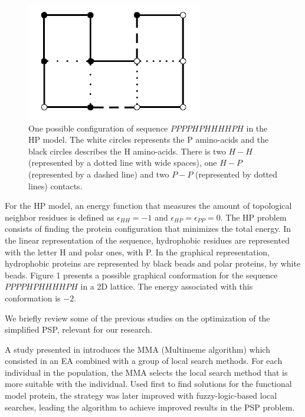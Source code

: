 \documentclass[conference]{IEEEtran}
\begin{document}
\begin{figure}[htb!] \label{fig:PROTEXAM}
	\centering
	\includegraphics[scale=0.7]{figures/proteinExample.png}
	\caption{One possible configuration of  sequence $PPPPHPHHHHPH$ in the HP model. The white circles represents the P amino-acids and the black circles describes the H amino-acids. There is two $H-H$ (represented by a dotted line with wide spaces), one $H-P$ (represented by a dashed line) and  two $P-P$  (represented by dotted lines) contacts.}
\end{figure}




For the HP model, an energy function that  measures the amount of topological  neighbor residues is defined  as  $\epsilon_{HH}=-1$ and $\epsilon_{HP}=\epsilon_{PP}=0$. The HP problem consists of finding the protein configuration that minimizes the total energy. In the linear representation of the sequence, hydrophobic residues are represented with the letter H and polar ones, with P. In the graphical representation, hydrophobic proteins are represented  by black beads and polar proteins, by white beads.  Figure 1 presents a possible graphical conformation  for  the sequence  $PPPPHPHHHHPH$ in a 2D lattice. The energy associated with this conformation is $-2$. 


We briefly review some of the previous studies on the optimization of the simplified PSP, relevant for our research.


%


A study presented in \cite{krasnogor2002multimeme} introduces the MMA (Multimeme algorithm) which consisted in an EA combined with a
group of local search methods. For each individual in the population, the MMA selects the local search method that is more suitable with the individual. Used first to find solutions for the functional model protein, the strategy was later improved with fuzzy-logic-based local searches, leading the algorithm to achieve improved results in the PSP problem.
\end{document}
